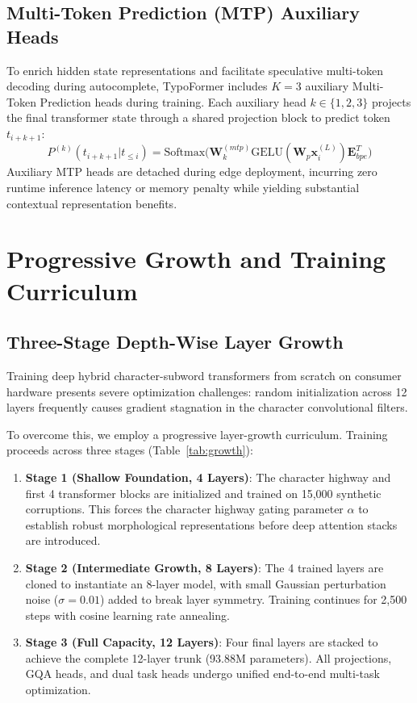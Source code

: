 \documentclass[10pt,journal,compsoc]{IEEEtran}
\begin{document}
\subsection{Multi-Token Prediction (MTP) Auxiliary Heads}
To enrich hidden state representations and facilitate speculative multi-token decoding during autocomplete, TypoFormer includes $K=3$ auxiliary Multi-Token Prediction heads during training. Each auxiliary head $k \in \{1, 2, 3\}$ projects the final transformer state through a shared projection block to predict token $t_{i+k+1}$:
\begin{equation}
P^{(k)}(t_{i+k+1} | t_{\le i}) = \mathrm{Softmax}\big( \mathbf{W}_k^{(mtp)} \mathrm{GELU}(\mathbf{W}_p \mathbf{x}_i^{(L)}) \mathbf{E}_{bpe}^T \big)
\end{equation}
Auxiliary MTP heads are detached during edge deployment, incurring zero runtime inference latency or memory penalty while yielding substantial contextual representation benefits.

\section{Progressive Growth and Training Curriculum}
\label{sec:curriculum}

\subsection{Three-Stage Depth-Wise Layer Growth}
Training deep hybrid character-subword transformers from scratch on consumer hardware presents severe optimization challenges: random initialization across 12 layers frequently causes gradient stagnation in the character convolutional filters. 

To overcome this, we employ a progressive layer-growth curriculum. Training proceeds across three stages (Table~\ref{tab:growth}):
\begin{enumerate}
    \item \textbf{Stage 1 (Shallow Foundation, 4 Layers)}: The character highway and first 4 transformer blocks are initialized and trained on 15,000 synthetic corruptions. This forces the character highway gating parameter $\alpha$ to establish robust morphological representations before deep attention stacks are introduced.
    \item \textbf{Stage 2 (Intermediate Growth, 8 Layers)}: The 4 trained layers are cloned to instantiate an 8-layer model, with small Gaussian perturbation noise ($\sigma = 0.01$) added to break layer symmetry. Training continues for 2,500 steps with cosine learning rate annealing.
    \item \textbf{Stage 3 (Full Capacity, 12 Layers)}: Four final layers are stacked to achieve the complete 12-layer trunk (93.88M parameters). All projections, GQA heads, and dual task heads undergo unified end-to-end multi-task optimization.
\end{enumerate}
\end{document}
